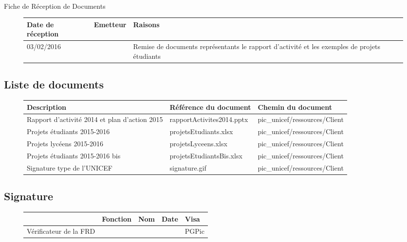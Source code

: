\documentclass[asi, sansVersion]{picInsa}
\begin{document}
\begin{center}
\huge
\nomEquipe{}\\
Fiche de Réception de Documents\\
\end{center}
\vspace{0.5cm}


\begin{figure}[H]
		\centering
		\begin{tabularx}{17cm}{|X|X|X|}
		\hline
		\rowcolor[gray]{0.85}Date de réception & Emetteur & Raisons \\
		\hline
		03/02/2016 & \nomClient{} & Remise de documents représentants le rapport d'activité et les exemples de projets étudiants\\
		\hline
		\end{tabularx}
\end{figure}

\subsection*{Liste de documents}

\begin{figure}[H]
		\centering
		\begin{tabularx}{17cm}{|X|X|X|}
		\hline
		\rowcolor[gray]{0.85} Description & Référence du document & Chemin du document \\
		\hline		
		Rapport d'activité 2014 et plan d'action 2015 & rapportActivites2014.pptx & pic\_unicef/ressources/Client \\
		\hline
		Projets étudiants 2015-2016 & projetsEtudiants.xlsx & pic\_unicef/ressources/Client\\
		\hline
		Projets lycéens 2015-2016 & projetsLyceens.xlsx & pic\_unicef/ressources/Client\\
		\hline
		Projets étudiants 2015-2016 bis & projetsEtudiantsBis.xlsx & pic\_unicef/ressources/Client\\
		\hline
		Signature type de l'UNICEF & signature.gif & pic\_unicef/ressources/Client\\
		\hline
		\end{tabularx}
\end{figure}

\subsection*{Signature}

\begin{figure}[H]
		\centering
		\begin{tabularx}{17cm}{|p{4cm}|X|X|X|X|}
		\hline
		\rowcolor[gray]{0.85}& Fonction & Nom & Date & Visa \\
		\hline
		 Vérificateur de la FRD & \RGC & \Mathieu &  & PGPic \\
		\hline
		\end{tabularx}
\end{figure}
\end{document}
